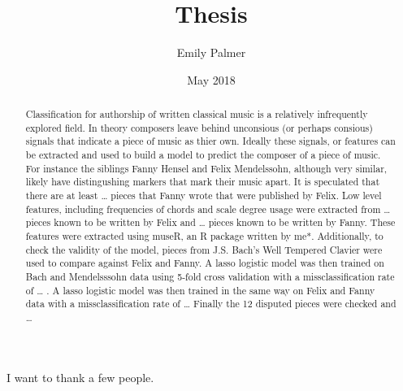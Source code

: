 \documentclass[12pt,twoside]{reedthesis}
\title{Thesis}
\author{Emily Palmer}
\date{May 2018}
\theoremstyle{definition}
\theoremstyle{definition}
\theoremstyle{definition}
\theoremstyle{remark}
\begin{document}
  \maketitle

\frontmatter %
\pagestyle{empty} %
  \begin{acknowledgements}
    I want to thank a few people.
  \end{acknowledgements}

  \hypersetup{linkcolor=black}
  \setcounter{tocdepth}{2}
  \tableofcontents

  \listoftables

  \listoffigures
  \begin{abstract}
    Classification for authorship of written classical music is a relatively
    infrequently explored field. In theory composers leave behind unconsious
    (or perhaps consious) signals that indicate a piece of music as thier
    own. Ideally these signals, or features can be extracted and used to
    build a model to predict the composer of a piece of music. For instance
    the siblings Fanny Hensel and Felix Mendelssohn, although very similar,
    likely have distingushing markers that mark their music apart. It is
    speculated that there are at least \ldots{} pieces that Fanny wrote that
    were published by Felix. Low level features, including frequencies of
    chords and scale degree usage were extracted from \ldots{} pieces known
    to be written by Felix and \ldots{} pieces known to be written by Fanny.
    These features were extracted using museR, an R package written by me*.
    Additionally, to check the validity of the model, pieces from J.S.
    Bach's Well Tempered Clavier were used to compare against Felix and
    Fanny. A lasso logistic model was then trained on Bach and Mendelsssohn
    data using 5-fold cross validation with a missclassification rate of
    \ldots{} . A lasso logistic model was then trained in the same way on
    Felix and Fanny data with a missclassification rate of \ldots{} Finally
    the 12 disputed pieces were checked and \ldots{}
  \end{abstract}

\mainmatter %
\pagestyle{fancyplain} %

\chapter{}\label{section}
\end{document}
